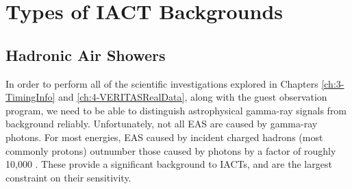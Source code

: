\section{Types of IACT Backgrounds}
\subsection{Hadronic Air Showers}

In order to perform all of the scientific investigations explored in Chapters \ref{ch:3-TimingInfo} and \ref{ch:4-VERITASRealData}, along with the guest observation program, we need to be able to distinguish astrophysical gamma-ray signals from background reliably. Unfortunately, not all EAS are caused by gamma-ray photons. For most energies, EAS caused by incident charged hadrons (most commonly protons) outnumber those caused by photons by a factor of roughly 10,000 \cite{Benbow}. These provide a significant background to IACTs, and are the largest constraint on their sensitivity.

